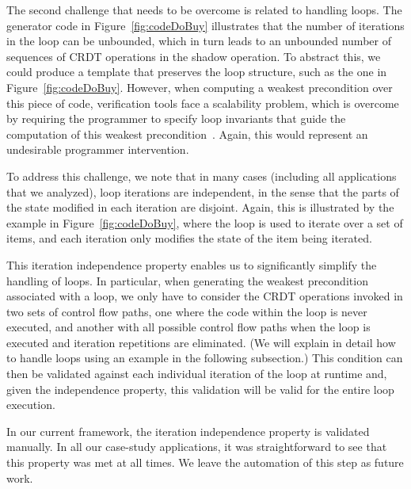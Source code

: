 The second challenge that needs to be overcome is related to handling
loops. %
The generator code in Figure~\ref{fig:codeDoBuy} illustrates that the number of
iterations in the loop can be unbounded, which in turn leads to an
unbounded number of sequences of CRDT operations in the shadow operation. To abstract
this, we could produce a template that preserves the loop structure, such as the one in Figure~\ref{fig:codeDoBuy}. 
However, when computing a weakest precondition over this piece of code,
verification tools face a scalability problem, which is overcome
by requiring the programmer to specify loop invariants that guide the
computation of this weakest precondition~\cite{Kuncak2007Jahob}. Again,
this would represent an undesirable
programmer intervention.

To address this challenge, we note that in many cases (including all
applications that we analyzed), loop iterations are independent, in the
sense that the parts of the state modified in each iteration are disjoint.
Again, this is illustrated by the example in Figure~\ref{fig:codeDoBuy}, where
the loop is used to iterate over a set of items, and each iteration
only modifies the state of the item being iterated.

This iteration independence property enables us to significantly simplify the handling of loops. 
In particular, when generating the weakest precondition associated with a loop, we only have to
consider the CRDT operations invoked in two sets of control flow paths, one where the code within the loop is
never executed, and another with all possible control flow paths 
when the loop is executed and iteration repetitions are eliminated. (We will explain in detail
how to handle loops using an example in the following subsection.)
This condition can then be validated against each individual iteration of the loop at runtime and,
given the independence property, this validation will be valid for the entire loop execution.

In our current framework, the iteration independence
property is validated manually. In all our case-study applications, it
was straightforward to see that this property was met at all times.
We leave the automation of this step as future work.


